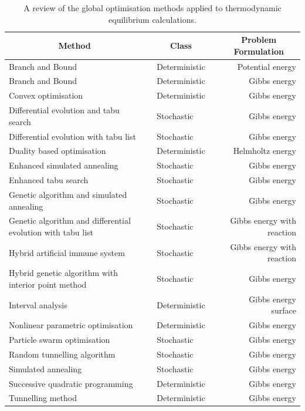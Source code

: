 \begin{table}[htp]
	\caption{A review of the global optimisation methods applied to thermodynamic equilibrium calculations.}
	\centering
	\begin{tabular}{@{}p{} c l c r@{}}
	\toprule
	\multicolumn{1}{c}{\textbf{Method}} &\phantom{abc} & \multicolumn{1}{c}{\textbf{Class}} &\phantom{abc} & \multicolumn{1}{c}{\textbf{Problem Formulation}}\\
	\midrule
	Branch and Bound \cite{CHEUNG2002169} && Deterministic && Potential energy \\
	Branch and Bound \cite{Piro16} && Deterministic  && Gibbs energy \\
	Convex optimisation \cite{ROSSI20111226}&& Deterministic && Gibbs energy \\
	Differential evolution and tabu search \cite{SRINIVAS2007760} && Stochastic && Gibbs energy \\
	Differential evolution with tabu list \cite{Srinivas:2007aa} && Stochastic && Gibbs energy \\
	Duality based optimisation \cite{PEREIRA20101} && Deterministic && Helmholtz energy \\
	Enhanced simulated annealing \cite{ZHU20003451} && Stochastic && Gibbs energy \\
	Enhanced tabu search \cite{Teh03} && Stochastic && Gibbs energy \\
	Genetic algorithm and simulated annealing \cite{Rangaiah01} && Stochastic && Gibbs energy \\
	Genetic algorithm and differential evolution with tabu list \cite{Bonilla-Petriciolet:2011aa} && Stochastic && Gibbs energy with reaction \\
	Hybrid artificial immune system \cite{Lin:2007aa} && Stochastic && Gibbs energy with reaction \\
	Hybrid genetic algorithm with interior point method \cite{STAUDT2009585} && Stochastic && Gibbs energy \\ 
	Interval analysis \cite{Scurto:2003aa} && Deterministic && Gibbs energy surface \\
	Nonlinear parametric optimisation \cite{Chaikunchuensakun:2002aa} && Deterministic && Gibbs energy \\
	Particle swarm optimisation \cite{Bonilla09,Piro16} && Stochastic && Gibbs energy \\
	Random tunnelling algorithm \cite{Srinivas06} && Stochastic && Gibbs energy \\
	Simulated annealing \cite{Bonilla-Petriciolet:2009aa} && Stochastic && Gibbs energy \\
	Successive quadratic programming \cite{LUCIA20002557} && Deterministic && Gibbs energy \\
	Tunnelling method \cite{Nichita02,Nichita:2004aa} && Deterministic && Gibbs energy \\
	\bottomrule
	\end{tabular}
	\label{tab:globalopt}
\end{table}

